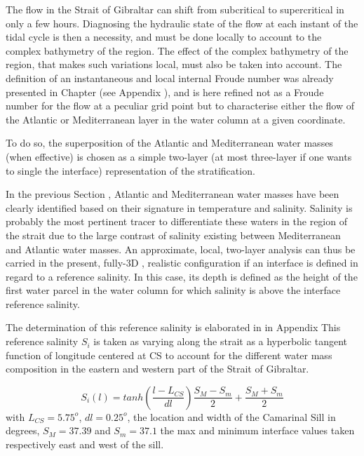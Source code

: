 The flow in the Strait of Gibraltar can shift from subcritical to supercritical in only a few hours. Diagnosing the hydraulic state of the flow at each instant of the tidal cycle is then a necessity, and must be done locally to account to the complex bathymetry of the region. The effect of the complex bathymetry of the region, that makes such variations local, must also be taken into account. The definition of an instantaneous and local internal Froude number was already presented in Chapter  (see Appendix ), and is here refined not as a Froude number for the flow at a peculiar grid point but to characterise either the flow of the Atlantic or Mediterranean layer in the water column at a given coordinate.

To do so, the superposition of the Atlantic and Mediterranean water masses (when effective) is chosen as a simple two-layer (at most three-layer if one wants to single the interface) representation of the stratification.

In the previous Section , Atlantic and Mediterranean water masses have been clearly identified based on their signature in temperature and salinity. Salinity is probably the most pertinent tracer to differentiate these waters in the region of the strait due to the large contrast of salinity existing between Mediterranean and Atlantic water masses.
An approximate, local, two-layer analysis can thus be carried in the present, fully-3D , realistic configuration if an interface is defined in regard to a reference salinity. In this case, its depth is defined as the height of the first water parcel in the water column for which salinity is above the interface reference salinity.

\color{red}The determination of this reference salinity is elaborated in in Appendix  \color{black}This reference salinity $S_i$ is taken as varying along the strait as a hyperbolic tangent function of longitude centered at CS to account for the different water mass composition in the eastern and western part of the Strait of Gibraltar. 

\begin{equation}
	S_i(l)=tanh(\frac{l-L_{CS}}{dl})\frac{S_M-S_m}{2}+\frac{S_M+S_m}{2}
	\label{eqSinterface}
\end{equation}
with $L_{CS}=5.75^o$, $dl=0.25^o$, the location and width of the Camarinal Sill in degrees, $S_M=37.39$ and $S_m=37.1$ the max and minimum interface values taken respectively east and west of the sill.

